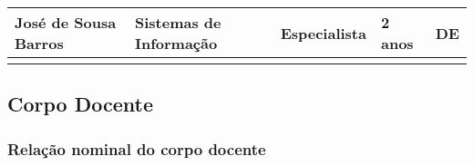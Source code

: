 \begin{table}[h]
\begin{tabular}{lllll}
\multicolumn{1}{|l|}{José de Sousa Barros}      & \multicolumn{1}{l|}{Sistemas de Informação} & \multicolumn{1}{l|}{Especialista}       & \multicolumn{1}{l|}{2 anos}                                                                       & \multicolumn{1}{l|}{DE}                                                                    \\ \hline
\multicolumn{5}{l}{\cellcolor[HTML]{9B9B9B}{\color[HTML]{9B9B9B} }}                                                                                                                                                                                                                                                                     
\end{tabular}
\end{table}

\subsection{Corpo Docente}

\newpage

\subsubsection{Rela\c{c}\~ao nominal do corpo docente}

